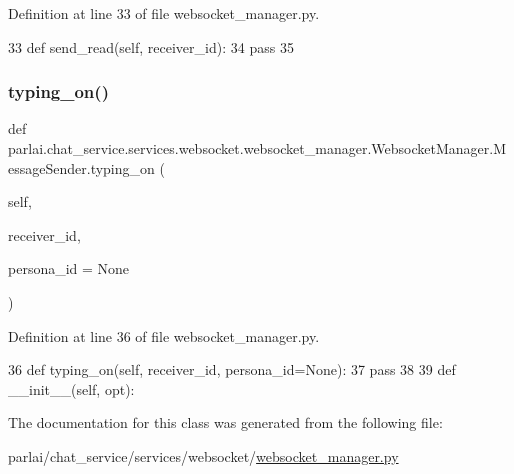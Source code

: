 Definition at line 33 of file websocket\+\_\+manager.\+py.


\begin{DoxyCode}
33         \textcolor{keyword}{def }send\_read(self, receiver\_id):
34             \textcolor{keywordflow}{pass}
35 
\end{DoxyCode}
\mbox{\label{classparlai_1_1chat__service_1_1services_1_1websocket_1_1websocket__manager_1_1WebsocketManager_1_1MessageSender_a3506683d0a5ab2fd03a585d4bfe51c92}} 
\subsubsection{\texorpdfstring{typing\+\_\+on()}{typing\_on()}}
{\footnotesize\ttfamily def parlai.\+chat\+\_\+service.\+services.\+websocket.\+websocket\+\_\+manager.\+Websocket\+Manager.\+Message\+Sender.\+typing\+\_\+on (\begin{DoxyParamCaption}\item[{}]{self,  }\item[{}]{receiver\+\_\+id,  }\item[{}]{persona\+\_\+id = {\ttfamily None} }\end{DoxyParamCaption})}



Definition at line 36 of file websocket\+\_\+manager.\+py.


\begin{DoxyCode}
36         \textcolor{keyword}{def }typing\_on(self, receiver\_id, persona\_id=None):
37             \textcolor{keywordflow}{pass}
38 
39     \textcolor{keyword}{def }\_\_init\_\_(self, opt):
\end{DoxyCode}


The documentation for this class was generated from the following file\+:\begin{DoxyCompactItemize}
\item 
parlai/chat\+\_\+service/services/websocket/\hyperlink{websocket__manager_8py}{websocket\+\_\+manager.\+py}\end{DoxyCompactItemize}
